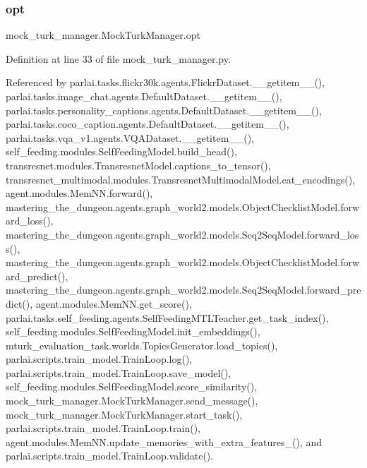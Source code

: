 \subsubsection{\texorpdfstring{opt}{opt}}
{\footnotesize\ttfamily mock\+\_\+turk\+\_\+manager.\+Mock\+Turk\+Manager.\+opt}



Definition at line 33 of file mock\+\_\+turk\+\_\+manager.\+py.



Referenced by parlai.\+tasks.\+flickr30k.\+agents.\+Flickr\+Dataset.\+\_\+\+\_\+getitem\+\_\+\+\_\+(), parlai.\+tasks.\+image\+\_\+chat.\+agents.\+Default\+Dataset.\+\_\+\+\_\+getitem\+\_\+\+\_\+(), parlai.\+tasks.\+personality\+\_\+captions.\+agents.\+Default\+Dataset.\+\_\+\+\_\+getitem\+\_\+\+\_\+(), parlai.\+tasks.\+coco\+\_\+caption.\+agents.\+Default\+Dataset.\+\_\+\+\_\+getitem\+\_\+\+\_\+(), parlai.\+tasks.\+vqa\+\_\+v1.\+agents.\+V\+Q\+A\+Dataset.\+\_\+\+\_\+getitem\+\_\+\+\_\+(), self\+\_\+feeding.\+modules.\+Self\+Feeding\+Model.\+build\+\_\+head(), transresnet.\+modules.\+Transresnet\+Model.\+captions\+\_\+to\+\_\+tensor(), transresnet\+\_\+multimodal.\+modules.\+Transresnet\+Multimodal\+Model.\+cat\+\_\+encodings(), agent.\+modules.\+Mem\+N\+N.\+forward(), mastering\+\_\+the\+\_\+dungeon.\+agents.\+graph\+\_\+world2.\+models.\+Object\+Checklist\+Model.\+forward\+\_\+loss(), mastering\+\_\+the\+\_\+dungeon.\+agents.\+graph\+\_\+world2.\+models.\+Seq2\+Seq\+Model.\+forward\+\_\+loss(), mastering\+\_\+the\+\_\+dungeon.\+agents.\+graph\+\_\+world2.\+models.\+Object\+Checklist\+Model.\+forward\+\_\+predict(), mastering\+\_\+the\+\_\+dungeon.\+agents.\+graph\+\_\+world2.\+models.\+Seq2\+Seq\+Model.\+forward\+\_\+predict(), agent.\+modules.\+Mem\+N\+N.\+get\+\_\+score(), parlai.\+tasks.\+self\+\_\+feeding.\+agents.\+Self\+Feeding\+M\+T\+L\+Teacher.\+get\+\_\+task\+\_\+index(), self\+\_\+feeding.\+modules.\+Self\+Feeding\+Model.\+init\+\_\+embeddings(), mturk\+\_\+evaluation\+\_\+task.\+worlds.\+Topics\+Generator.\+load\+\_\+topics(), parlai.\+scripts.\+train\+\_\+model.\+Train\+Loop.\+log(), parlai.\+scripts.\+train\+\_\+model.\+Train\+Loop.\+save\+\_\+model(), self\+\_\+feeding.\+modules.\+Self\+Feeding\+Model.\+score\+\_\+similarity(), mock\+\_\+turk\+\_\+manager.\+Mock\+Turk\+Manager.\+send\+\_\+message(), mock\+\_\+turk\+\_\+manager.\+Mock\+Turk\+Manager.\+start\+\_\+task(), parlai.\+scripts.\+train\+\_\+model.\+Train\+Loop.\+train(), agent.\+modules.\+Mem\+N\+N.\+update\+\_\+memories\+\_\+with\+\_\+extra\+\_\+features\+\_\+(), and parlai.\+scripts.\+train\+\_\+model.\+Train\+Loop.\+validate().

